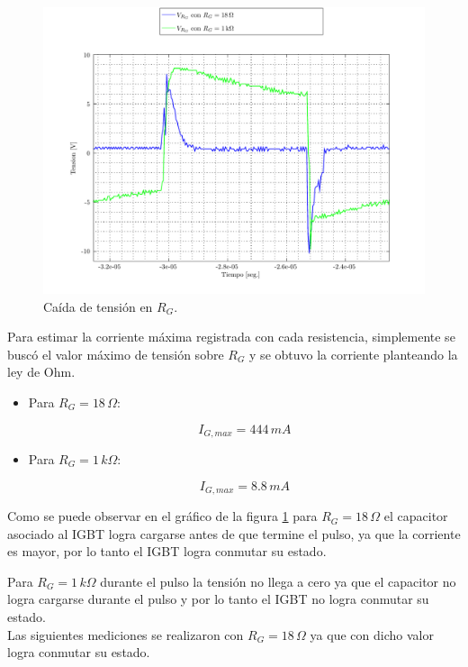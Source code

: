 \documentclass[10pt,spanish,a4paper,openany,notitlepage]{article}
\begin{document}
\begin{figure}[H]
\centering
\includegraphics[scale=0.65]{./Octave/IGBT/Vr.pdf}
\caption{Caída de tensión en $R_G$.}
\label{fig:V_RG}
\end{figure}

Para estimar la corriente máxima registrada con cada resistencia, 
simplemente se buscó el valor máximo de tensión sobre $R_G$ y se 
obtuvo la corriente planteando la ley de Ohm.

\begin{itemize}

\item Para $R_G=18\,\unit{\Omega}$:

\[ \displaystyle I_{G,max}=444\,\unit{mA} \]

\item Para $R_G=1\,\unit{k\Omega}$:

\[ \displaystyle I_{G,max}=8.8\,\unit{mA} \]

\end{itemize}

Como se puede observar en el gráfico de la figura \ref{fig:V_RG} para
$R_G = 18\, \unit{\Omega}$ el capacitor asociado al IGBT logra cargarse
antes de que termine el pulso, ya que la corriente es mayor, por lo tanto
el IGBT logra conmutar su estado.

Para $R_G = 1\, \unit{k\Omega}$ durante el pulso la tensión no llega
a cero ya que el capacitor no logra cargarse durante el pulso y por lo tanto el IGBT no
logra conmutar su estado.\\

Las siguientes mediciones se realizaron con $R_G = 18\, \unit{\Omega}$
ya que con dicho valor logra conmutar su estado.
\end{document}
